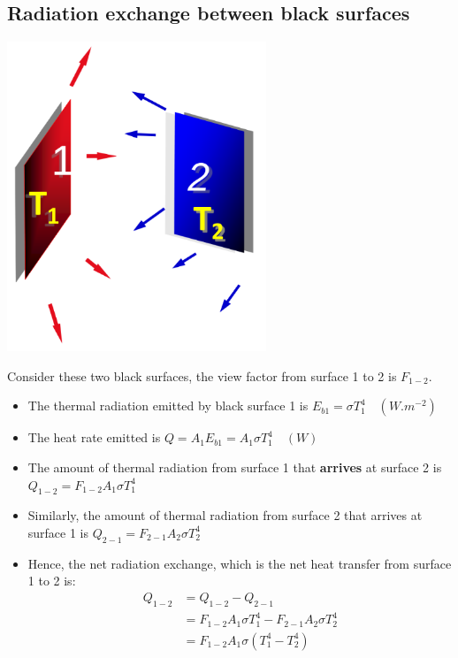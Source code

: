 \documentclass[11pt]{article}
\begin{document}
\subsection{Radiation exchange between black surfaces}
\label{sec:orgeabbb36}
\begin{center}
\includegraphics[height=25em]{./images/radiation-exchange-between-black-surfaces-diagram.png}
\end{center}
Consider these two black surfaces, the view factor from surface 1 to 2 is \(F_{1-2}\).
\begin{itemize}
\item The thermal radiation emitted by black surface 1 is \(E_{b1} = \sigma T_1^4 \quad (\unit{W.m^{-2}})\)
\item The heat rate emitted is \(Q = A_1 E_{b1} = A_1 \sigma T_1^4 \quad (\unit{W})\)
\item The amount of thermal radiation from surface 1 that \textbf{arrives} at surface 2 is \(Q_{1-2} = F_{1-2} A_1 \sigma T_1^4\)
\item Similarly, the amount of thermal radiation from surface 2 that arrives at surface 1 is \(Q_{2-1} = F_{2-1} A_2 \sigma T_2^4\)
\item Hence, the net radiation exchange, which is the net heat transfer from surface 1 to 2 is:
\begin{align*}
Q_{1-2} &= Q_{1-2} - Q_{2-1} \\
&= F_{1-2} A_1 \sigma T_1^4 - F_{2-1} A_2 \sigma T_2^4 \\
&= F_{1-2} A_1 \sigma \left(T_1^4 - T_2^4 \right)
\end{align*}
\end{itemize}
\end{document}
